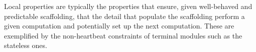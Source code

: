 Local properties are typically the properties that ensure, given well-behaved and predictable scaffolding, that the detail that populate the scaffolding perform a given computation and potentially set up the next computation. These are exemplified by the non-heartbeat constraints of terminal modules such as the stateless ones.
